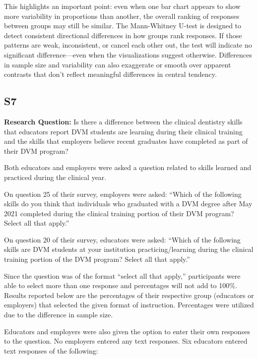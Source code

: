\documentclass[
  12pt,
  letterpaper,
  DIV=11,
  numbers=noendperiod]{scrartcl}
\numberwithin{figure}{section}
\numberwithin{table}{section}
\begin{document}
This highlights an important point: even when one bar chart appears to
show more variability in proportions than another, the overall ranking
of responses between groups may still be similar. The Mann-Whitney
U-test is designed to detect consistent directional differences in how
groups rank responses. If those patterns are weak, inconsistent, or
cancel each other out, the test will indicate no significant
difference---even when the visualizations suggest otherwise. Differences
in sample size and variability can also exaggerate or smooth over
apparent contrasts that don't reflect meaningful differences in central
tendency.

\subsection{S7}\label{s7}

\textbf{Research Question:} Is there a difference between the clinical
dentistry skills that educators report DVM students are learning during
their clinical training and the skills that employers believe recent
graduates have completed as part of their DVM program?

Both educators and employers were asked a question related to skills
learned and practiced during the clinical year.

On question 25 of their survey, employers were asked: ``Which of the
following skills do you think that individuals who graduated with a DVM
degree after May 2021 completed during the clinical training portion of
their DVM program? Select all that apply.''

On question 20 of their survey, educators were asked: ``Which of the
following skills are DVM students at your institution
practicing/learning during the clinical training portion of the DVM
program? Select all that apply.''

Since the question was of the format ``select all that apply,''
participants were able to select more than one response and percentages
will not add to 100\%. Results reported below are the percentages of
their respective group (educators or employers) that selected the given
format of instruction. Percentages were utilized due to the difference
in sample size.

Educators and employers were also given the option to enter their own
responses to the question. No employers entered any text responses. Six
educators entered text responses of the following:
\end{document}
